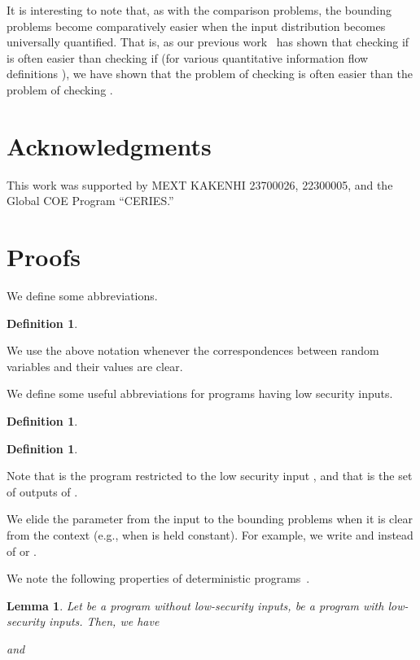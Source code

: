 \documentclass{llncs}
\newtheorem{definition}[theorem]{Definition}
\newtheorem{lemma}[theorem]{Lemma}
\begin{document}
It is interesting to note that, as with the comparison problems, the
bounding problems become comparatively easier when the input
distribution becomes universally quantified.  That is, as our previous
work~\cite{DBLP:conf/csfw/yasuoka2010} has shown that checking if
 is
often easier than checking if  (for various quantitative information flow
definitions ), we have shown that the problem of checking
 is often easier than the
problem of checking .

\section*{Acknowledgments}
  This work was supported by MEXT KAKENHI 23700026, 22300005, and the
  Global COE Program ``CERIES.''




\appendix
\section{Proofs}
\label{appendix}

We define some abbreviations.
\begin{definition}
\label{def:distabrv}
  
\end{definition}
We use the above notation whenever the correspondences between random variables
and their values are clear.

We define some useful abbreviations for programs having low security inputs.

\begin{definition}
  
\end{definition}

\begin{definition}

\end{definition}

Note that  is the program  restricted to the low security
input , and that  is the set of outputs of
.

We elide the parameter  from the input to the bounding problems when
it is clear from the context (e.g., when  is held constant).  For
example, we write  and  instead
of  or .

We note the following properties of deterministic
programs~\cite{clark05}.
\begin{lemma}
\label{lem:detse}
Let  be a program without low-security inputs,  be a program
with low-security inputs.  Then, we have

and

\end{lemma}
\end{document}

